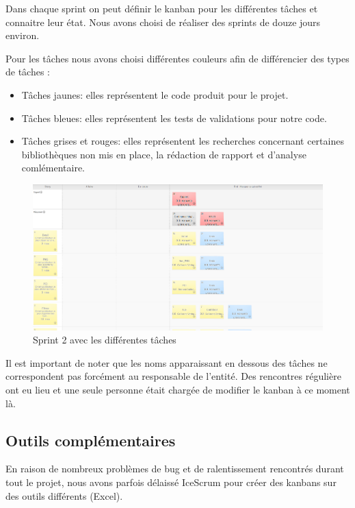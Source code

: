 \documentclass [a4paper,11pt]{article}
\begin{document}
Dans chaque sprint on peut définir le kanban pour les différentes tâches et connaitre leur état. Nous avons choisi de réaliser des sprints de douze jours environ.
\newline

Pour les tâches nous avons choisi différentes couleurs afin de différencier des types de tâches :
\newline

\begin{itemize}
\item Tâches jaunes: elles représentent le code produit pour le projet.
\item Tâches bleues: elles représentent les tests de validations pour notre code.
\item Tâches grises et rouges: elles représentent les recherches concernant certaines bibliothèques non mis en place, la rédaction de rapport et d'analyse comlémentaire.
\end{itemize}

\begin{figure}[H]
\centering
\includegraphics[scale=0.3]{img/icescrum.png}
\caption {Sprint 2 avec les différentes tâches}
\end{figure}

Il est important de noter que les noms apparaissant en dessous des tâches ne correspondent pas forcément au responsable de l'entité. Des rencontres régulière ont eu lieu et une seule personne était chargée de modifier le kanban à ce moment là.

\subsection{Outils complémentaires}
En raison de nombreux problèmes de bug et de ralentissement rencontrés durant tout le projet, nous avons parfois délaissé IceScrum pour créer des kanbans sur des outils différents (Excel). 
\end{document}
